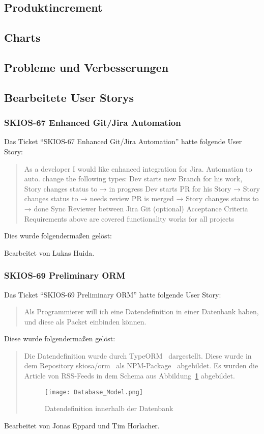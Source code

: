 \subsection{Produktincrement}
\subsection{Charts}
\subsection{Probleme und Verbesserungen}


\subsection{Bearbeitete User Storys}

\subsubsection{SKIOS-67 Enhanced Git/Jira Automation}
Das Ticket \enquote{SKIOS-67 Enhanced Git/Jira Automation} hatte folgende User Story:
\begin{quotation}
    As a developer I would like enhanced integration for Jira.
    Automation to auto. change the following types:
    Dev starts new Branch for his work, Story changes status to → in progress
    Dev starts PR for his Story → Story changes status to → needs review
    PR is merged → Story changes status to → done
    Sync Reviewer between Jira  Git (optional)
    Acceptance Criteria
    Requirements above are covered
    functionality works for all projects
\end{quotation}
Dies wurde folgendermaßen gelöst:
\begin{quotation}
    
\end{quotation}
Bearbeitet von Lukas Huida.

\subsubsection{SKIOS-69 Preliminary ORM}
Das Ticket \enquote{SKIOS-69 Preliminary ORM} hatte folgende User Story:
\begin{quotation}
    Als Programmierer will ich eine Datendefinition in einer Datenbank
    haben, und diese als Packet einbinden können.
\end{quotation}
Diese wurde folgendermaßen gelöst:
\begin{quotation}
Die Datendefinition wurde durch TypeORM~\parencite{web/TypeORM} dargestellt.
Diese wurde in dem Repository skiosa/orm~\parencite{git/skiosa/orm} als NPM-Package~\parencite{web/npm} abgebildet.
Es wurden die Article von RSS-Feeds in dem Schema aus Abbildung~\ref{fig:databaseORM} abgebildet.
\begin{figure}
    \texttt{[image: Database\_Model.png]}
    \caption{Datendefinition innerhalb der Datenbank}
    \label{fig:databaseORM}
\end{figure}
\end{quotation}
Bearbeitet von Jonas Eppard und Tim Horlacher.

